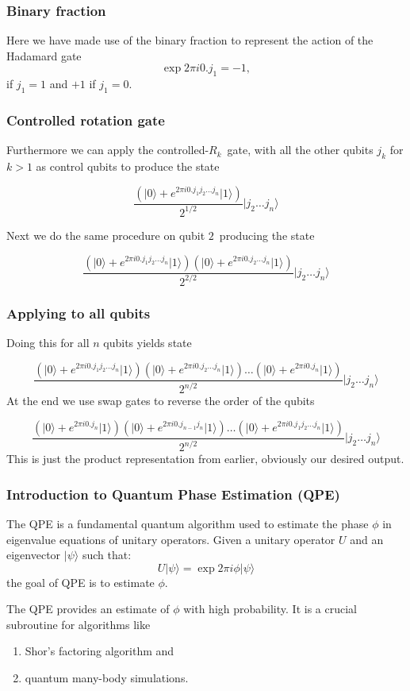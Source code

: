 \documentclass{beamer}
\begin{document}
\begin{frame}
\frametitle{Binary fraction}

Here we have made use of the binary fraction to represent the action of the Hadamard gate 
\[
\exp{2\pi i 0.j_1} = -1,
\]
if $j_1 = 1$ and $+1$ if $j_1 = 0$.
\end{frame}

\begin{frame}
\frametitle{Controlled rotation gate}

Furthermore we can apply the controlled-$R_k$ gate, with all the other qubits $j_k$ for $k>1$ as control qubits to produce the state

\[
\frac{\left(\vert 0 \rangle + e^{2\pi i 0.j_1j_2\dots j_n}\vert 1\rangle\right)}{2^{1/2}} \vert j_2 \dots j_n\rangle
\]

Next we do the same procedure on qubit $2$ producing the state

\[
\frac{\left(\vert 0 \rangle + e^{2\pi i 0.j_1j_2\dots j_n}\vert 1\rangle\right)\left(\vert 0 \rangle + e^{2\pi i 0.j_2\dots j_n}\vert 1\rangle\right)}{2^{2/2}} \vert j_2 \dots j_n\rangle
\]
\end{frame}

\begin{frame}
\frametitle{Applying to all qubits}

Doing this for all $n$ qubits yields state

\[
\frac{\left(\vert 0 \rangle + e^{2\pi i 0.j_1j_2\dots j_n}\vert 1\rangle\right)\left(\vert 0 \rangle + e^{2\pi i 0.j_2\dots j_n}\vert 1\rangle\right)\dots \left(\vert 0 \rangle + e^{2\pi i 0.j_n}\vert 1\rangle\right)}{2^{n/2}} \vert j_2 \dots j_n\rangle
\]
At the end we use swap gates to reverse the order of the qubits

\[
\frac{\left(\vert 0 \rangle + e^{2\pi i 0.j_n}\vert 1\rangle\right)\left(\vert 0 \rangle + e^{2\pi i 0.j_{n-1}j_n}\vert 1\rangle\right)\dots\left(\vert 0 \rangle + e^{2\pi i 0.j_1j_2\dots j_n}\vert 1\rangle\right) }{2^{n/2}} \vert j_2 \dots j_n\rangle
\]
This is just the product representation from earlier, obviously our desired output.
\end{frame}

\begin{frame}
\frametitle{Introduction to Quantum Phase Estimation (QPE)}

The QPE is a fundamental quantum algorithm used to estimate the phase $\phi$ in eigenvalue equations of unitary operators.
Given a unitary operator $U$ and an eigenvector $| \psi \rangle$ such that:
\[
U | \psi \rangle = \exp{2\pi i \phi} | \psi \rangle
\]
the goal of QPE is to estimate $\phi$.

The QPE provides an estimate of $\phi$ with high probability. It is a
crucial subroutine for algorithms like
\begin{enumerate}
\item Shor's factoring algorithm and

\item quantum many-body simulations.
\end{enumerate}

\noindent
\end{frame}
\end{document}
